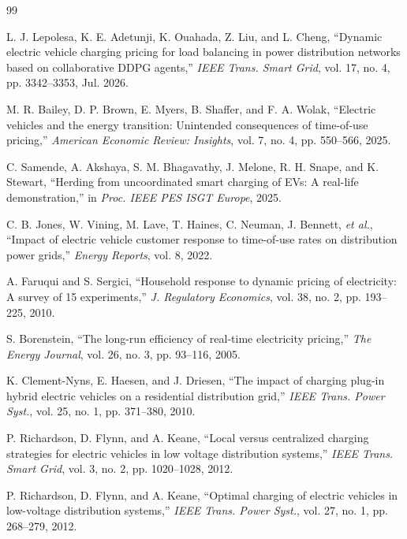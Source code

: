 \documentclass[10pt,journal]{IEEEtran}
\begin{document}
\begin{thebibliography}{99}\IEEEoverridecommandlockouts%

L. J. Lepolesa, K. E. Adetunji, K. Ouahada, Z. Liu, and L. Cheng,
``Dynamic electric vehicle charging pricing for load balancing in power
distribution networks based on collaborative DDPG agents,''
\emph{IEEE Trans. Smart Grid}, vol. 17, no. 4, pp. 3342--3353, Jul. 2026.

M. R. Bailey, D. P. Brown, E. Myers, B. Shaffer, and F. A. Wolak,
``Electric vehicles and the energy transition: Unintended consequences of
time-of-use pricing,''
\emph{American Economic Review: Insights}, vol. 7, no. 4, pp. 550--566, 2025.

C. Samende, A. Akshaya, S. M. Bhagavathy, J. Melone, R. H. Snape, and
K. Stewart,
``Herding from uncoordinated smart charging of EVs: A real-life
demonstration,''
in \emph{Proc. IEEE PES ISGT Europe}, 2025.

C. B. Jones, W. Vining, M. Lave, T. Haines, C. Neuman, J. Bennett,
\emph{et al.},
``Impact of electric vehicle customer response to time-of-use rates on
distribution power grids,''
\emph{Energy Reports}, vol. 8, 2022.

A. Faruqui and S. Sergici,
``Household response to dynamic pricing of electricity: A survey of 15
experiments,''
\emph{J. Regulatory Economics}, vol. 38, no. 2, pp. 193--225, 2010.

S. Borenstein,
``The long-run efficiency of real-time electricity pricing,''
\emph{The Energy Journal}, vol. 26, no. 3, pp. 93--116, 2005.

K. Clement-Nyns, E. Haesen, and J. Driesen,
``The impact of charging plug-in hybrid electric vehicles on a residential
distribution grid,''
\emph{IEEE Trans. Power Syst.}, vol. 25, no. 1, pp. 371--380, 2010.

P. Richardson, D. Flynn, and A. Keane,
``Local versus centralized charging strategies for electric vehicles in low
voltage distribution systems,''
\emph{IEEE Trans. Smart Grid}, vol. 3, no. 2, pp. 1020--1028, 2012.

P. Richardson, D. Flynn, and A. Keane,
``Optimal charging of electric vehicles in low-voltage distribution
systems,''
\emph{IEEE Trans. Power Syst.}, vol. 27, no. 1, pp. 268--279, 2012.


\end{thebibliography}
\end{document}
